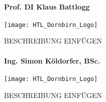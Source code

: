\paragraph{Prof. DI Klaus Battlogg}
\begin{minipage}{0.37\textwidth}
	\centering
	\texttt{[image: HTL\_Dornbirn\_Logo]}
\end{minipage}
\hfill
\begin{minipage}{0.6\textwidth}
	BESCHREIBUNG EINFÜGEN
\end{minipage}%
\vspace{1ex}

\paragraph{Ing. Simon Köldorfer, BSc.}
\begin{minipage}{0.37\textwidth}
	\centering
	\texttt{[image: HTL\_Dornbirn\_Logo]}
\end{minipage}
\hfill
\begin{minipage}{0.6\textwidth}
	BESCHREIBUNG EINFÜGEN
\end{minipage}%
\vspace{1ex}